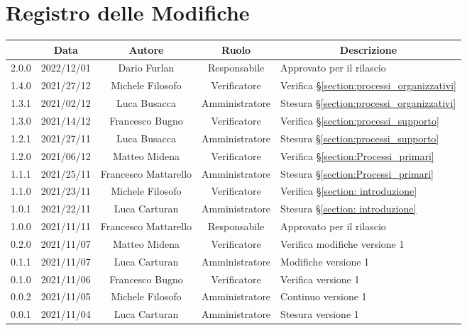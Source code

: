 \thispagestyle{empty}
\section*{Registro delle Modifiche}

\begin{center}
	\renewcommand{\arraystretch}{1.8}
	\begin{longtable}[c]{c | c | c | c | p{5cm}}
		\rowcolor[HTML]{125E28}
		\multicolumn{1}{c}{\color[HTML]{FFFFFF} \textbf{Versione}} & 
		\multicolumn{1}{c}{\color[HTML]{FFFFFF} \textbf{Data}} & 
		\multicolumn{1}{c}{\color[HTML]{FFFFFF} \textbf{Autore}} & 
		\multicolumn{1}{c}{\color[HTML]{FFFFFF} \textbf{Ruolo}} & 
		\multicolumn{1}{c}{\color[HTML]{FFFFFF} \textbf{Descrizione}} \\
		\endhead
		2.0.0 & 2022/12/01 & Dario Furlan & Responsabile & Approvato per il rilascio\\
		1.4.0 & 2021/27/12 & Michele Filosofo & Verificatore & Verifica §\ref{section:processi_organizzativi}\\
		1.3.1 & 2021/02/12 & Luca Busacca & Amministratore & Stesura §\ref{section:processi_organizzativi} \\
		1.3.0 & 2021/14/12 & Francesco Bugno & Verificatore & Verifica §\ref{section:processi_supporto}\\
		1.2.1 & 2021/27/11 & Luca Busacca & Amministratore & Stesura §\ref{section:processi_supporto} \\
		1.2.0 & 2021/06/12 & Matteo Midena & Verificatore & Verifica §\ref{section:Processi_primari} \\
		1.1.1 & 2021/25/11 & Francesco Mattarello & Amministratore & Stesura §\ref{section:Processi_primari} \\
		1.1.0 & 2021/23/11 & Michele Filosofo & Verificatore & Verifica §\ref{section: introduzione} \\
		1.0.1 & 2021/22/11 & Luca Carturan & Amministratore & Stesura §\ref{section: introduzione}\\
		1.0.0 & 2021/11/11 & Francesco Mattarello & Responsabile & Approvato per il rilascio\\
		0.2.0 & 2021/11/07 & Matteo Midena & Verificatore & Verifica modifiche versione 1\\
		0.1.1 & 2021/11/07 & Luca Carturan & Amministratore & Modifiche versione 1\\
		0.1.0 & 2021/11/06 & Francesco Bugno & Verificatore & Verifica versione 1\\
		0.0.2 & 2021/11/05 & Michele Filosofo & Amministratore & Continuo versione 1\\
		0.0.1 & 2021/11/04 & Luca Carturan & Amministratore &Stesura versione 1\\


	\end{longtable}
\end{center}
